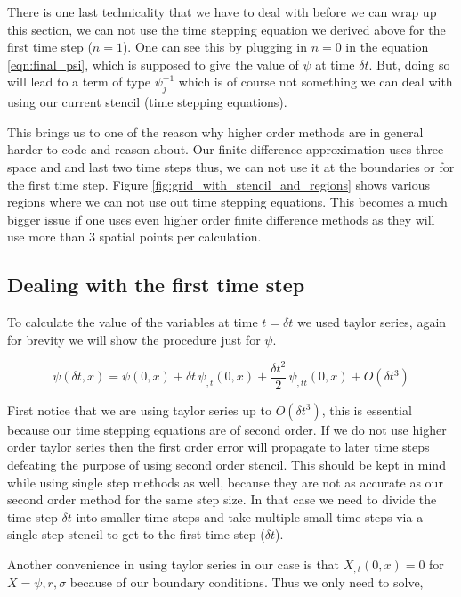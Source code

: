 There is one last technicality that we have to deal with before we can wrap up this section, we can not use the time stepping equation we derived above for the first time step ($n=1$). One can see this by plugging in $n=0$ in the equation \ref{eqn:final_psi}, which is supposed to give the value of $\psi$ at time $\delta t$. But, doing so will lead to a term of type $\psi^{-1}_j$ which is of course not something we can deal with using our current stencil (time stepping equations).


This brings us to one of the reason why higher order methods are in general harder to code and reason about. Our finite difference approximation uses three space and and last two time steps thus, we can not use it at the boundaries or for the first time step. Figure \ref{fig:grid_with_stencil_and_regions} shows various regions where we can not use out time stepping equations. This becomes a much bigger issue if one uses even higher order finite difference methods as they will use more than 3 spatial points per calculation.


\subsection{Dealing with the first time step}

To calculate the value of the variables at time $t = \delta t$ we used taylor series, again for brevity we will show the procedure just for $\psi$.

\begin{equation*}
    \psi(\delta t,x) = \psi(0,x) + \delta t\, \psi_{,t}(0,x) + \frac{\delta t^2}{2} \, \psi_{,tt}(0,x) + O(\delta t^3)
\end{equation*}


First notice that we are using taylor series up to $O(\delta t^3)$, this is essential because our time stepping equations are of second order. If we do not use higher order taylor series then the first order error will propagate to later time steps defeating the purpose of using second order stencil. This should be kept in mind while using single step methods as well, because they are not as accurate as our second order method for the same step size. In that case we need to divide the time step $\delta t$ into smaller time steps and take multiple small time steps via a single step stencil to get to the first time step ($\delta t$).


Another convenience in using taylor series in our case is that $X_{,t}(0,x) = 0$ for $X = \psi, r ,\sigma$ because of our boundary conditions. Thus we only need to solve,

